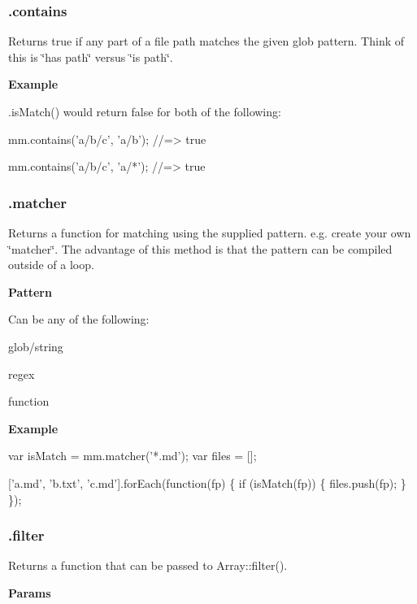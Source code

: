 \subsubsection*{.contains}

Returns true if any part of a file path matches the given glob pattern. Think of this is \char`\"{}has path\char`\"{} versus \char`\"{}is path\char`\"{}.

{\bfseries Example}

{\ttfamily .is\+Match()} would return false for both of the following\+:


\begin{DoxyCode}
mm.contains('a/b/c', 'a/b');
//=> true

mm.contains('a/b/c', 'a/*');
//=> true
\end{DoxyCode}


\subsubsection*{.matcher}

Returns a function for matching using the supplied pattern. e.\+g. create your own \char`\"{}matcher\char`\"{}. The advantage of this method is that the pattern can be compiled outside of a loop.

{\bfseries Pattern}

Can be any of the following\+:


\begin{DoxyItemize}
\item {\ttfamily glob/string}
\item {\ttfamily regex}
\item {\ttfamily function}
\end{DoxyItemize}

{\bfseries Example}


\begin{DoxyCode}
var isMatch = mm.matcher('*.md');
var files = [];

['a.md', 'b.txt', 'c.md'].forEach(function(fp) \{
  if (isMatch(fp)) \{
    files.push(fp);
  \}
\});
\end{DoxyCode}


\subsubsection*{.filter}

Returns a function that can be passed to {\ttfamily Array\+::filter()}.

{\bfseries Params}


